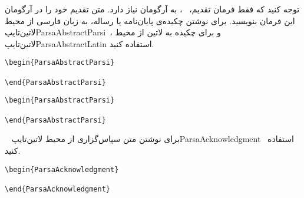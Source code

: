 \documentclass[12pt,a4paper,twoside,fleqn,notitlepage,openany]{extarticle}
\begin{document}
\begin{table}[H] 
\end{table}

توجه کنید که فقط فرمان تقدیم، \textrm{}~، به آرگومان نیاز دارد\@. متن تقدیم خود را در آرگومان این فرمان بنویسید\@. 
برای نوشتن چکیده‌ی پایان‌نامه یا رساله، به زبان فارسی از محیط ‌لاتین{‌تایپ{ParsaAbstractParsi}}~، و برای چکیده به لاتین از محیط ‌لاتین{‌تایپ{ParsaAbstractLatin}} استفاده کنید\@. \\
\begin{latin}
\begin{minipage}{0.48\textwidth}
\begin{verbatim}
\begin{ParsaAbstractParsi}

\end{ParsaAbstractParsi}
\end{verbatim}
\end{minipage}
\begin{minipage}{0.48\textwidth}
\begin{verbatim}
\begin{ParsaAbstractParsi}

\end{ParsaAbstractParsi}
\end{verbatim}
\end{minipage}
\end{latin}
~
برای نوشتن متن سپاس‌گزاری از محیط ‌لاتین{‌تایپ{ParsaAcknowledgment}} ~استفاده کنید.\\
\begin{latin}
\begin{verbatim}
\begin{ParsaAcknowledgment}

\end{ParsaAcknowledgment}
\end{verbatim}
\end{latin}
\end{document}
